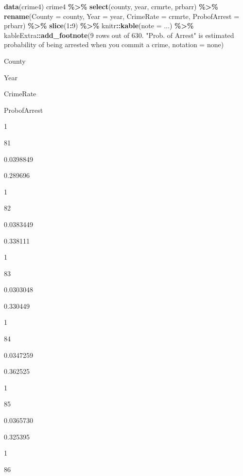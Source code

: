 \documentclass[
]{article}
\newenvironment{Shaded}{\begin{snugshade}}{\end{snugshade}}
\newcommand{\AttributeTok}[1]{\textcolor[rgb]{0.13,0.29,0.53}{#1}}
\newcommand{\DecValTok}[1]{\textcolor[rgb]{0.00,0.00,0.81}{#1}}
\newcommand{\FunctionTok}[1]{\textcolor[rgb]{0.13,0.29,0.53}{\textbf{#1}}}
\newcommand{\NormalTok}[1]{#1}
\newcommand{\SpecialCharTok}[1]{\textcolor[rgb]{0.81,0.36,0.00}{\textbf{#1}}}
\newcommand{\StringTok}[1]{\textcolor[rgb]{0.31,0.60,0.02}{#1}}
\begin{document}
\begin{Shaded}
\begin{Highlighting}[]
\FunctionTok{data}\NormalTok{(crime4)}
\NormalTok{crime4 }\SpecialCharTok{\%\textgreater{}\%}
  \FunctionTok{select}\NormalTok{(county, year, crmrte, prbarr) }\SpecialCharTok{\%\textgreater{}\%}
  \FunctionTok{rename}\NormalTok{(}\AttributeTok{County =}\NormalTok{ county,}
         \AttributeTok{Year =}\NormalTok{ year,}
         \AttributeTok{CrimeRate =}\NormalTok{ crmrte,}
         \AttributeTok{ProbofArrest =}\NormalTok{ prbarr) }\SpecialCharTok{\%\textgreater{}\%}
  \FunctionTok{slice}\NormalTok{(}\DecValTok{1}\SpecialCharTok{:}\DecValTok{9}\NormalTok{) }\SpecialCharTok{\%\textgreater{}\%}
\NormalTok{  knitr}\SpecialCharTok{::}\FunctionTok{kable}\NormalTok{(}\AttributeTok{note =} \StringTok{\textquotesingle{}...\textquotesingle{}}\NormalTok{) }\SpecialCharTok{\%\textgreater{}\%}
\NormalTok{  kableExtra}\SpecialCharTok{::}\FunctionTok{add\_footnote}\NormalTok{(}\StringTok{\textquotesingle{}9 rows out of 630. "Prob. of Arrest" is estimated probability of being arrested when you commit a crime\textquotesingle{}}\NormalTok{, }\AttributeTok{notation =} \StringTok{\textquotesingle{}none\textquotesingle{}}\NormalTok{)}
\end{Highlighting}
\end{Shaded}

County

Year

CrimeRate

ProbofArrest

1

81

0.0398849

0.289696

1

82

0.0383449

0.338111

1

83

0.0303048

0.330449

1

84

0.0347259

0.362525

1

85

0.0365730

0.325395

1

86
\end{document}
